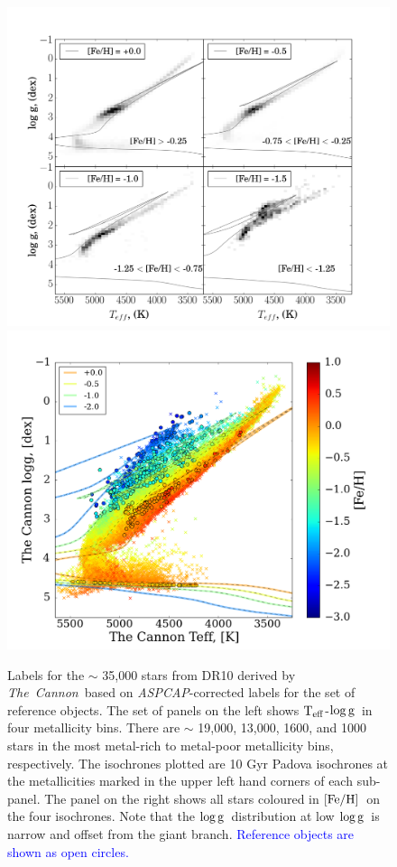 \documentclass[12pt, preprint]{aastex}
\newcommand{\tc}{\textsl{The~Cannon}}
\newcommand{\aspcap}{\textsl{ASPCAP}}
\newcommand{\teff}{\mbox{$\rm T_{eff}$}}
\newcommand{\feh}{\mbox{$\rm [Fe/H]$}}
\newcommand{\logg}{\mbox{$\rm \log g$}}
\begin{document}
\begin{figure}[!h]
\centering
  \includegraphics[scale=0.26]{./plots/aftersubmit/fig8a.png}
  \hspace{-20pt}
    \includegraphics[scale=0.26]{./plots/aftersubmit/fig8b2.png}
\caption{Labels for the $\sim$ 35,000 stars from DR10 derived by \tc\ based on \aspcap-corrected labels for the set of reference objects. The set of panels on the left shows \teff-\logg\ in four metallicity bins. There are $\sim$ 19,000, 13,000, 1600, and 1000 stars in the most metal-rich to metal-poor metallicity bins, respectively. The isochrones plotted are 10 Gyr Padova isochrones at the metallicities marked in the upper left hand corners of each sub-panel.  The panel on the right shows all stars coloured in \feh\ on the four isochrones. Note that the \logg\ distribution at low \logg\ is narrow and offset from the giant branch. \textcolor{blue}{ Reference objects are shown as open circles.} }
\label{fig:iso}
\end{figure}
\end{document}
